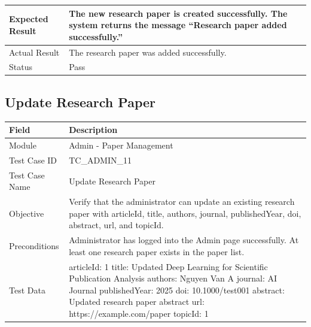 \documentclass[12pt,a4paper]{article}
\begin{document}
{{\begin{longtable}{|p{4cm}|p{10cm}|}
	Expected Result &
	The new research paper is created successfully. The system returns the message ``Research paper added successfully.'' \\ \hline
	
	Actual Result &
	The research paper was added successfully. \\ \hline
	
	Status & Pass \\ \hline
	
\end{longtable}
\subsection{Update Research Paper}
\begin{longtable}{|p{4cm}|p{10cm}|}
	\hline
	\textbf{Field} & \textbf{Description} \\ \hline
	
	Module & Admin - Paper Management \\ \hline
	
	Test Case ID & TC\_ADMIN\_11 \\ \hline
	
	Test Case Name & Update Research Paper \\ \hline
	
	Objective &
	Verify that the administrator can update an existing research paper with articleId, title, authors, journal, publishedYear, doi, abstract, url, and topicId. \\ \hline
	
	Preconditions &
	Administrator has logged into the Admin page successfully. \newline
	At least one research paper exists in the paper list.
	\\ \hline
	
	Test Data &
	articleId: 1 \newline
	title: Updated Deep Learning for Scientific Publication Analysis \newline
	authors: Nguyen Van A \newline
	journal: AI Journal \newline
	publishedYear: 2025 \newline
	doi: 10.1000/test001 \newline
	abstract: Updated research paper abstract \newline
	url: https://example.com/paper \newline
	topicId: 1
	\\ \hline
	

\end{longtable}}}
\end{document}
